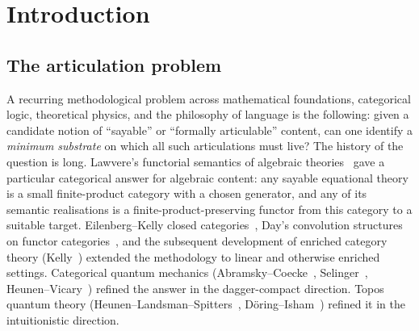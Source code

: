\documentclass[11pt,a4paper]{article}
\theoremstyle{plain}
\theoremstyle{definition}
\theoremstyle{remark}
\begin{document}
\begin{abstract}
\bigskip
\noindent\textbf{Keywords:} enriched Lawvere theory, symmetric monoidal closed category, biproducts, dagger compact, Bohrification, Pauli group, Heyting algebra, frame, Sierpinski locale, Universal Sayability, articulation, Knaster--Tarski, Lean 4, Mathlib.

\medskip
\noindent\textbf{2020 Mathematics Subject Classification:} Primary 18C10 (Theories with arities; specifically, Lawvere theories and operads), 18D20 (Enriched categories -- properties and structure), 18M05 (Monoidal categories). Secondary 03G30 (Categorical logic, topoi), 18C50 (Categorical semantics of formal languages), 03B70 (Logic in computer science), 81P16 (Quantum measurement theory, state operations, state preparations), 06D20 (Heyting algebras -- categorical and topological aspects).
\end{abstract}

\section{Introduction}\label{sec:intro}

\subsection{The articulation problem}\label{sec:intro:problem}

A recurring methodological problem across mathematical foundations, categorical logic, theoretical physics, and the philosophy of language is the following: given a candidate notion of ``sayable'' or ``formally articulable'' content, can one identify a \emph{minimum substrate} on which all such articulations must live? The history of the question is long. Lawvere's functorial semantics of algebraic theories~\cite{Law63} gave a particular categorical answer for algebraic content: any sayable equational theory is a small finite-product category with a chosen generator, and any of its semantic realisations is a finite-product-preserving functor from this category to a suitable target. Eilenberg--Kelly closed categories~\cite{EK66}, Day's convolution structures on functor categories~\cite{Day70}, and the subsequent development of enriched category theory (Kelly~\cite{Kel82}) extended the methodology to linear and otherwise enriched settings. Categorical quantum mechanics (Abramsky--Coecke~\cite{AC04}, Selinger~\cite{Sel07,Sel12}, Heunen--Vicary~\cite{HV19}) refined the answer in the dagger-compact direction. Topos quantum theory (Heunen--Landsman--Spitters~\cite{HLS09}, D\"oring--Isham~\cite{DI08}) refined it in the intuitionistic direction.
\end{document}

